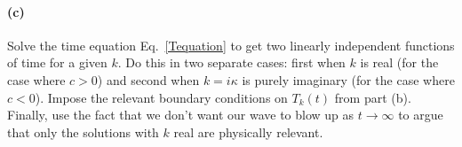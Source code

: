 \documentclass{article}
\begin{document}
\paragraph{(c)}
Solve the time equation Eq.~\ref{Tequation} to get two linearly independent functions of time for a given $k$.  
Do this in two separate cases:  first when $k$ is real (for the case where $c>0$) and second when
$k=i\kappa$ is purely imaginary (for the case where $c<0$).  Impose the relevant boundary conditions on $T_{k}(t)$ from part (b).  Finally, use the fact
that we don't want our wave to blow up as $t\to\infty$ to argue that only the solutions with $k$ real are physically relevant.
\end{document}
